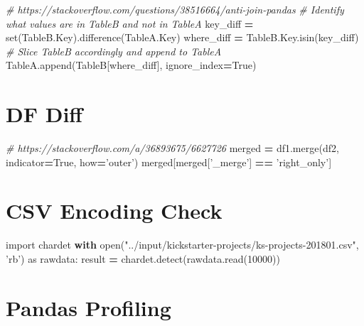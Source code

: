 \documentclass[]{book}
\newenvironment{Shaded}{\begin{snugshade}}{\end{snugshade}}
\newcommand{\DecValTok}[1]{\textcolor[rgb]{0.00,0.00,0.81}{#1}}
\newcommand{\StringTok}[1]{\textcolor[rgb]{0.31,0.60,0.02}{#1}}
\newcommand{\ImportTok}[1]{#1}
\newcommand{\CommentTok}[1]{\textcolor[rgb]{0.56,0.35,0.01}{\textit{#1}}}
\newcommand{\VariableTok}[1]{\textcolor[rgb]{0.00,0.00,0.00}{#1}}
\newcommand{\ControlFlowTok}[1]{\textcolor[rgb]{0.13,0.29,0.53}{\textbf{#1}}}
\newcommand{\OperatorTok}[1]{\textcolor[rgb]{0.81,0.36,0.00}{\textbf{#1}}}
\newcommand{\BuiltInTok}[1]{#1}
\newcommand{\NormalTok}[1]{#1}
\begin{document}
\begin{Shaded}
\begin{Highlighting}[]
\CommentTok{# https://stackoverflow.com/questions/38516664/anti-join-pandas}
\CommentTok{# Identify what values are in TableB and not in TableA}
\NormalTok{key_diff }\OperatorTok{=} \BuiltInTok{set}\NormalTok{(TableB.Key).difference(TableA.Key)}
\NormalTok{where_diff }\OperatorTok{=}\NormalTok{ TableB.Key.isin(key_diff)}
\CommentTok{# Slice TableB accordingly and append to TableA}
\NormalTok{TableA.append(TableB[where_diff], ignore_index}\OperatorTok{=}\VariableTok{True}\NormalTok{)}
\end{Highlighting}
\end{Shaded}

\section{DF Diff}\label{df-diff}

\begin{Shaded}
\begin{Highlighting}[]
\CommentTok{# https://stackoverflow.com/a/36893675/6627726}
\NormalTok{merged }\OperatorTok{=}\NormalTok{ df1.merge(df2, indicator}\OperatorTok{=}\VariableTok{True}\NormalTok{, how}\OperatorTok{=}\StringTok{'outer'}\NormalTok{)}
\NormalTok{merged[merged[}\StringTok{'_merge'}\NormalTok{] }\OperatorTok{==} \StringTok{'right_only'}\NormalTok{]}
\end{Highlighting}
\end{Shaded}

\section{CSV Encoding Check}\label{csv-encoding-check}

\begin{Shaded}
\begin{Highlighting}[]
\ImportTok{import}\NormalTok{ chardet}
\ControlFlowTok{with} \BuiltInTok{open}\NormalTok{(}\StringTok{"../input/kickstarter-projects/ks-projects-201801.csv"}\NormalTok{, }\StringTok{'rb'}\NormalTok{) }\ImportTok{as}\NormalTok{ rawdata:}
\NormalTok{    result }\OperatorTok{=}\NormalTok{ chardet.detect(rawdata.read(}\DecValTok{10000}\NormalTok{))}
\end{Highlighting}
\end{Shaded}

\section{Pandas Profiling}\label{pandas-profiling}
\end{document}
